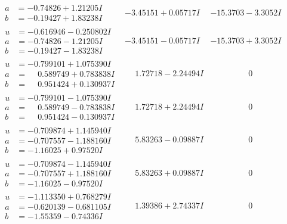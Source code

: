 \documentclass[1p]{elsarticle_modified}
\theoremstyle{definition}
\begin{document}
$$\begin{array}{c|c|c}
\begin{aligned}
a &= -0.74826 + 1.21205 I \\
b &= -0.19427 + 1.83238 I\end{aligned}
 & -3.45151 + 0.05717 I & -15.3703 - 3.3052 I \\ \hline\begin{aligned}
u &= -0.616946 - 0.250802 I \\
a &= -0.74826 - 1.21205 I \\
b &= -0.19427 - 1.83238 I\end{aligned}
 & -3.45151 - 0.05717 I & -15.3703 + 3.3052 I \\ \hline\begin{aligned}
u &= -0.799101 + 1.075390 I \\
a &= \phantom{-}0.589749 + 0.783838 I \\
b &= \phantom{-}0.951424 + 0.130937 I\end{aligned}
 & \phantom{-}1.72718 - 2.24494 I & \phantom{-0.000000 } 0 \\ \hline\begin{aligned}
u &= -0.799101 - 1.075390 I \\
a &= \phantom{-}0.589749 - 0.783838 I \\
b &= \phantom{-}0.951424 - 0.130937 I\end{aligned}
 & \phantom{-}1.72718 + 2.24494 I & \phantom{-0.000000 } 0 \\ \hline\begin{aligned}
u &= -0.709874 + 1.145940 I \\
a &= -0.707557 - 1.188160 I \\
b &= -1.16025 + 0.97520 I\end{aligned}
 & \phantom{-}5.83263 - 0.09887 I & \phantom{-0.000000 } 0 \\ \hline\begin{aligned}
u &= -0.709874 - 1.145940 I \\
a &= -0.707557 + 1.188160 I \\
b &= -1.16025 - 0.97520 I\end{aligned}
 & \phantom{-}5.83263 + 0.09887 I & \phantom{-0.000000 } 0 \\ \hline\begin{aligned}
u &= -1.113350 + 0.768279 I \\
a &= -0.620139 - 0.681105 I \\
b &= -1.55359 - 0.74336 I\end{aligned}
 & \phantom{-}1.39386 + 2.74337 I & \phantom{-0.000000 } 0 \\ \hline\begin{aligned}

\end{aligned}
\end{array}$$
\end{document}
